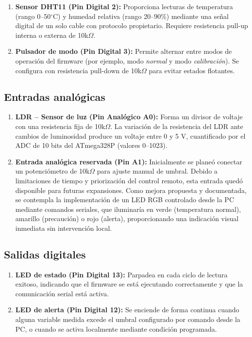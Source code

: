 \begin{enumerate}[leftmargin=*]
    \item \textbf{Sensor DHT11 (Pin Digital 2):} Proporciona lecturas de temperatura (rango 0--50$^\circ$C) y humedad relativa (rango 20--90\%) mediante una señal digital de un solo cable con protocolo propietario. Requiere resistencia pull-up interna o externa de 10k$\Omega$.
    \item \textbf{Pulsador de modo (Pin Digital 3):} Permite alternar entre modos de operación del firmware (por ejemplo, modo \textit{normal} y modo \textit{calibración}). Se configura con resistencia pull-down de 10k$\Omega$ para evitar estados flotantes.
\end{enumerate}

\subsection{Entradas analógicas}

\begin{enumerate}[leftmargin=*]
    \item \textbf{LDR -- Sensor de luz (Pin Analógico A0):} Forma un divisor de voltaje con una resistencia fija de 10k$\Omega$. La variación de la resistencia del LDR ante cambios de luminosidad produce un voltaje entre 0 y 5 V, cuantificado por el ADC de 10 bits del ATmega328P (valores 0--1023).
    \item \textbf{Entrada analógica reservada (Pin A1):} Inicialmente se planeó conectar un potenciómetro de 10k$\Omega$ para ajuste manual de umbral. Debido a limitaciones de tiempo y priorización del control remoto, esta entrada quedó disponible para futuras expansiones. Como mejora propuesta y documentada, se contempla la implementación de un LED RGB controlado desde la PC mediante comandos seriales, que iluminaría en verde (temperatura normal), amarillo (precaución) o rojo (alerta), proporcionando una indicación visual inmediata sin intervención local.
\end{enumerate}

\subsection{Salidas digitales}

\begin{enumerate}[leftmargin=*]
    \item \textbf{LED de estado (Pin Digital 13):} Parpadea en cada ciclo de lectura exitoso, indicando que el firmware se está ejecutando correctamente y que la comunicación serial está activa.
    \item \textbf{LED de alerta (Pin Digital 12):} Se enciende de forma continua cuando alguna variable medida excede el umbral configurado por comando desde la PC, o cuando se activa localmente mediante condición programada.
\end{enumerate}

